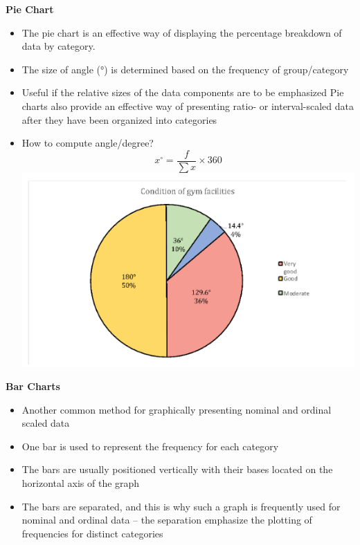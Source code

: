 \documentclass[
  a4paper,
  DIV=11,
  numbers=noendperiod,
  oneside]{scrreprt}
\providecommand{\tightlist}{%
  \setlength{\itemsep}{0pt}\setlength{\parskip}{0pt}}\usepackage{longtable,booktabs,array}
\begin{document}
\textbf{Pie Chart}

\begin{itemize}
\tightlist
\item
  The pie chart is an effective way of displaying the percentage
  breakdown of data by category.
\item
  The size of angle (°) is determined based on the frequency of
  group/category
\item
  Useful if the relative sizes of the data components are to be
  emphasized Pie charts also provide an effective way of presenting
  ratio- or interval-scaled data after they have been organized into
  categories
\item
  How to compute angle/degree? \[
  x^{\circ} = \frac{f}{\sum{x}} \times 360
  \]
  \includegraphics[width=5.20833in,height=\textheight]{images/ch2/picture5.png}
\end{itemize}

\textbf{Bar Charts}

\begin{itemize}
\tightlist
\item
  Another common method for graphically presenting nominal and ordinal
  scaled data
\item
  One bar is used to represent the frequency for each category
\item
  The bars are usually positioned vertically with their bases located on
  the horizontal axis of the graph
\item
  The bars are separated, and this is why such a graph is frequently
  used for nominal and ordinal data -- the separation emphasize the
  plotting of frequencies for distinct categories
\end{itemize}
\end{document}
